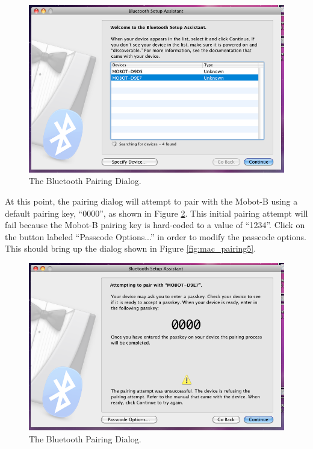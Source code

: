\documentclass{article}
\begin{document}
\begin{figure}[H]
\begin{center}
\includegraphics[width=5in]{images/mac_pairing3.png}
\end{center}
\caption{\label{fig:mac_pairing3} The Bluetooth Pairing Dialog.}
\end{figure}

At this point, the pairing dialog will attempt to pair with the Mobot-B using a default pairing key, ``0000'', as
shown in Figure \ref{fig:mac_pairing4}. This initial pairing attempt will fail because the Mobot-B pairing key
is hard-coded to a value of ``1234''. Click on the button labeled ``Passcode Options...'' in order to 
modify the passcode options. This should bring up the dialog shown in Figure \ref{fig:mac_pairing5}.

\begin{figure}[H]
\begin{center}
\includegraphics[width=5in]{images/mac_pairing4.png}
\end{center}
\caption{\label{fig:mac_pairing4} The Bluetooth Pairing Dialog.}
\end{figure}
\end{document}
